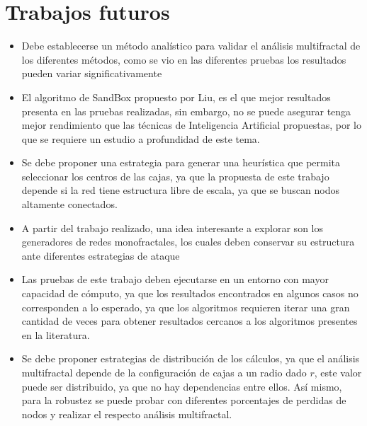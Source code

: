 \newpage
\section{Trabajos futuros}

\begin{itemize}
    \item Debe establecerse un método analístico para validar el análisis multifractal de los diferentes métodos, como se vio en las diferentes pruebas los resultados pueden variar significativamente
    \item El algoritmo de SandBox propuesto por Liu\cite{Liu2015}, es el que mejor resultados presenta en las pruebas realizadas, sin embargo, no se puede asegurar tenga mejor rendimiento que las técnicas de Inteligencia Artificial propuestas, por lo que se requiere un estudio a profundidad de este tema.
    \item Se debe proponer una estrategia para generar una heurística que permita seleccionar los centros de las cajas, ya que la propuesta de este trabajo depende si la red tiene estructura libre de escala, ya que se buscan nodos altamente conectados.
    \item A partir del trabajo realizado, una idea interesante a explorar son los generadores de redes monofractales, los cuales deben conservar su estructura ante diferentes estrategias de ataque
    \item Las pruebas de este trabajo deben ejecutarse en un entorno con mayor capacidad de cómputo, ya que los resultados encontrados en algunos casos no corresponden a lo esperado, ya que los algoritmos requieren iterar una gran cantidad de veces para obtener resultados cercanos a los algoritmos presentes en la literatura.
    \item Se debe proponer estrategias de distribución de los cálculos, ya que el análisis multifractal depende de la configuración de cajas a un radio dado $r$, este valor puede ser distribuido, ya que no hay dependencias entre ellos. Así mismo, para la robustez se puede probar con diferentes porcentajes de perdidas de nodos y realizar el respecto análisis multifractal.
\end{itemize}
